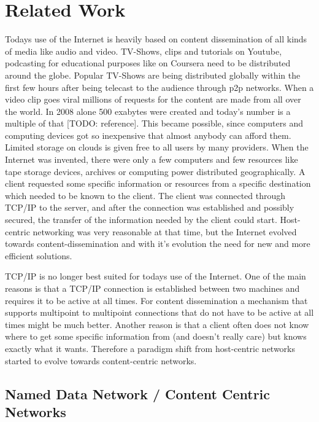 \chapter{Related Work}

Todays use of the Internet is heavily based on content dissemination of all kinds of media like audio and video. TV-Shows, clips and tutorials on Youtube, podcasting for educational purposes like on Coursera need to be distributed around the globe. Popular TV-Shows are being distributed globally within the first few hours after being telecast to the audience through p2p networks. When a video clip goes viral millions of requests for the content are made from all over the world. In 2008 alone 500 exabytes were created and today's number is a multiple of that [TODO: reference]. This became possible, since computers and computing devices got so inexpensive that almost anybody can afford them. Limited storage on clouds is given free to all users by many providers. When the Internet was invented, there were only a few computers and few resources like tape storage devices, archives or computing power distributed geographically. A client requested some specific information or resources from a specific destination which needed to be known to the client. The client was connected through TCP/IP to the server, and after the connection was established and possibly secured, the transfer of the information needed by the client could start. Host-centric networking was very reasonable at that time, but the Internet evolved towards content-dissemination and with it's evolution the need for new and more efficient solutions.

\vspace{5mm} %

TCP/IP is no longer best suited for todays use of the Internet. One of the main reasons is that a TCP/IP connection is established between two machines and requires it to be active at all times. For content dissemination a mechanism that supports multipoint to multipoint connections that do not have to be active at all times might be much better. Another reason is that a client often does not know where to get some specific information from (and doesn't really care) but knows exactly what it wants. Therefore a paradigm shift from host-centric networks started to evolve towards content-centric networks.

\newpage
\section{Named Data Network / Content Centric Networks}

